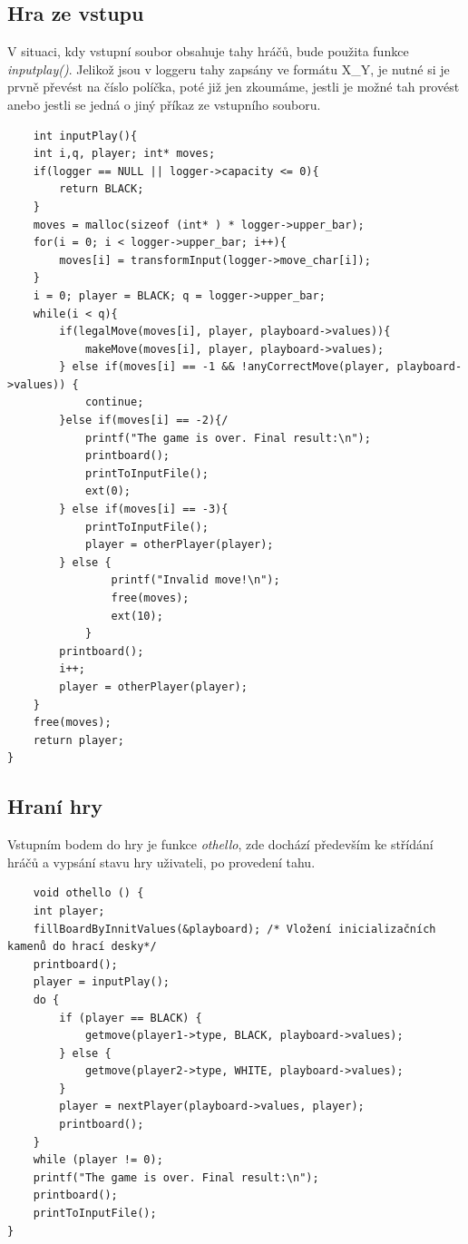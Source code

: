 \documentclass[
12pt,
a4paper,
pdftex,
czech,
titlepage
]{report}
\begin{document}
\subsection{Hra ze vstupu}
V situaci, kdy vstupní soubor obsahuje tahy hráčů, bude použita funkce \textit{inputplay()}. Jelikož jsou v loggeru tahy zapsány ve formátu X\_Y, je nutné si je prvně převést na číslo políčka, poté již jen zkoumáme, jestli je možné tah provést anebo jestli se jedná o jiný příkaz ze vstupního souboru. 

\begin{verbatim}
    int inputPlay(){
    int i,q, player; int* moves;
    if(logger == NULL || logger->capacity <= 0){
        return BLACK;
    }
    moves = malloc(sizeof (int* ) * logger->upper_bar);
    for(i = 0; i < logger->upper_bar; i++){
        moves[i] = transformInput(logger->move_char[i]);
    }
    i = 0; player = BLACK; q = logger->upper_bar;
    while(i < q){
        if(legalMove(moves[i], player, playboard->values)){ 
            makeMove(moves[i], player, playboard->values);
        } else if(moves[i] == -1 && !anyCorrectMove(player, playboard->values)) { 
            continue;
        }else if(moves[i] == -2){/
            printf("The game is over. Final result:\n");
            printboard();
            printToInputFile();
            ext(0);
        } else if(moves[i] == -3){ 
            printToInputFile();
            player = otherPlayer(player);
        } else {
                printf("Invalid move!\n");
                free(moves);
                ext(10);
            }
        printboard();
        i++;
        player = otherPlayer(player);
    }
    free(moves);
    return player;
}
\end{verbatim}
\subsection{Hraní hry}
Vstupním bodem do hry je funkce \textit{othello}, zde dochází především ke střídání hráčů a vypsání stavu hry uživateli, po provedení tahu.
\begin{verbatim}
    void othello () {
    int player;
    fillBoardByInnitValues(&playboard); /* Vložení inicializačních kamenů do hrací desky*/
    printboard();
    player = inputPlay();
    do {
        if (player == BLACK) {
            getmove(player1->type, BLACK, playboard->values);
        } else {
            getmove(player2->type, WHITE, playboard->values);
        }
        player = nextPlayer(playboard->values, player);
        printboard();
    }
    while (player != 0);
    printf("The game is over. Final result:\n");
    printboard();
    printToInputFile();
}
\end{verbatim}
\end{document}
